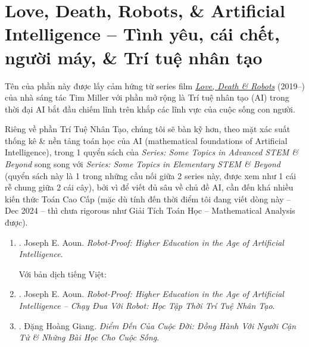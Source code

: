 \documentclass[12pt,twoside]{book}
\begin{document}
\section{Love, Death, Robots, \& Artificial Intelligence -- Tình yêu, cái chết, người máy, \& Trí tuệ nhân tạo}
Tên của phần này được lấy cảm hứng từ series film \href{https://www.imdb.com/title/tt9561862}{\it Love, Death \& Robots} (2019--) của nhà sáng tác {\sc Tim Miller} với phần mở rộng là Trí tuệ nhân tạo (AI) trong thời đại AI bắt đầu chiếm lĩnh trên khắp các lĩnh vực của cuộc sống con người.

Riêng về phần Trí Tuệ Nhân Tạo, chúng tôi sẽ bàn kỹ hơn, theo mặt xác suất thống kê \& nền tảng toán học của AI (mathematical foundations of Artificial Intelligence), trong 1 quyển sách của {\it Series: Some Topics in Advanced STEM \& Beyond} song song với {\it Series: Some Topics in Elementary STEM \& Beyond} (quyển sách này là 1 trong những cầu nối giữa 2 series này, được xem như 1 cái rễ chung giữa 2 cái cây), bởi vì để viết đủ sâu về chủ đề AI, cần đến khá nhiều kiến thức Toán Cao Cấp (mặc dù tính đến thời điểm tôi đang viết dòng này -- Dec 2024 -- thì chưa rigorous như Giải Tích Toán Học -- Mathematical Analysis được).

\begin{enumerate}
	\item \cite{Aoun_robot-proof}. {\sc Joseph E. Aoun}. {\it Robot-Proof: Higher Education in the Age of Artificial Intelligence}.
	
	Với bản dịch tiếng Việt:
	\item \cite{Aoun_robot-proof_VN}. {\sc Joseph E. Aoun}. {\it Robot-Proof: Higher Education in the Age of Artificial Intelligence -- Chạy Đua Với Robot: Học Tập Thời Trí Tuệ Nhân Tạo}.
	\item \cite{Giang_death}. {\sc Đặng Hoàng Giang}. {\it Điểm Đến Của Cuộc Đời: Đồng Hành Với Người Cận Tử \& Những Bài Học Cho Cuộc Sống}.
\end{enumerate}
\end{document}
